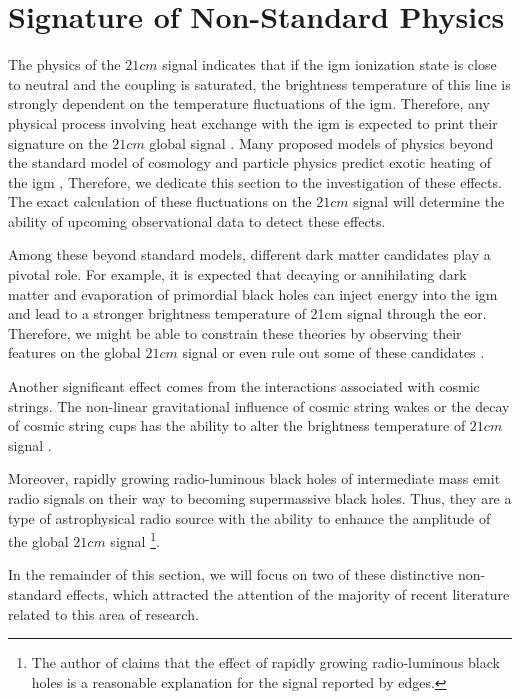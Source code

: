 \documentclass[12pt, TexShade, letterpaper]{report}
\begin{document}
\section{Signature of Non-Standard Physics}
\label{chap:global21cm,sub:non_standard}
The physics of the $21cm$ signal indicates that if the \gls{igm} ionization state is close to neutral and the coupling is saturated, the brightness temperature of this line is strongly dependent on the temperature fluctuations of the \gls{igm}. Therefore, any physical process involving heat exchange with the \gls{igm} is expected to print their signature on the $21cm$ global signal \cite{21century}. Many proposed models of physics beyond the standard model of cosmology and particle physics predict exotic heating of the 
\gls{igm} \cite{21century}, Therefore, we dedicate this section to the investigation of these effects. The exact calculation of these fluctuations on the $21cm$ signal will determine the ability of upcoming observational data to detect these effects.\par
Among these beyond standard models, different dark matter candidates play a pivotal role. For example, it is expected that decaying or annihilating dark matter and evaporation of primordial black holes can inject energy into the \gls{igm} and lead to a stronger brightness temperature of 21cm signal through the \gls{eor}. Therefore, we might be able to constrain these theories by observing their features on the global $21cm$ signal \cite{primordial_bh, new_physics_thesis, primordial_bh_binary, 21limit_dm_bh, bound_dm} or even rule out some of these candidates \cite{rule_out}.\par
Another significant effect comes from the interactions associated with cosmic strings. The non-linear gravitational influence of cosmic string wakes or the decay of cosmic string cups has the ability to alter the brightness temperature of $21cm$ signal \cite{WF_effect_oscar, cosmic_string_oscar, string_loop_robert}. \par
Moreover, rapidly growing radio-luminous black holes of intermediate mass emit radio signals on their way to becoming supermassive black holes. Thus, they are a type of astrophysical radio source with the ability to enhance the amplitude of the global $21cm$ signal \cite{bh_cosmioc_dawn} \footnote{The author of \cite{bh_cosmioc_dawn} claims that the effect of rapidly growing radio-luminous black holes is a reasonable explanation for the signal reported by \gls{edges}.}. \par
In the remainder of this section, we will focus on two of these distinctive non-standard effects, which attracted the attention of the majority of recent literature related to this area of research.\par
\end{document}
